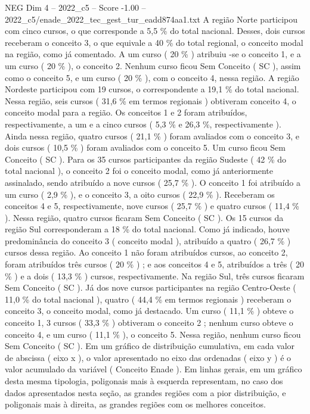 \begin{textsample}{NEG Dim 4 – 2022\_c5 – Score -1.00 – 2022\_c5/enade\_2022\_tec\_gest\_tur\_eadd874aa1.txt}
A região Norte participou com cinco cursos, o que corresponde a 5,5 \% do total nacional.
Desses, dois cursos receberam o conceito 3, o que equivale a 40 \% do total regional, o conceito modal na região, como já comentado.
A um curso ( 20 \% ) atribuiu -se o conceito 1, e a um curso ( 20 \% ), o conceito 2.
Nenhum curso ficou Sem Conceito ( SC ), assim como o conceito 5, e um curso ( 20 \% ), com o conceito 4, nessa região.
A região Nordeste participou com 19 cursos, o correspondente a 19,1 \% do total nacional.
Nessa região, seis cursos ( 31,6 \% em termos regionais ) obtiveram conceito 4, o conceito modal para a região.
Os conceitos 1 e 2 foram atribuídos, respectivamente, a um e a cinco cursos ( 5,3 \% e 26,3 \%, respectivamente ).
Ainda nessa região, quatro cursos ( 21,1 \% ) foram avaliados com o conceito 3, e dois cursos ( 10,5 \% ) foram avaliados com o conceito 5.
Um curso ficou Sem Conceito ( SC ).
Para os 35 cursos participantes da região Sudeste ( 42 \% do total nacional ), o conceito 2 foi o conceito modal, como já anteriormente assinalado, sendo atribuído a nove cursos ( 25,7 \% ).
O conceito 1 foi atribuído a um curso ( 2,9 \% ), e o conceito 3, a oito cursos ( 22,9 \% ).
Receberam os conceitos 4 e 5, respectivamente, nove cursos ( 25,7 \% ) e quatro cursos ( 11,4 \% ).
Nessa região, quatro cursos ficaram Sem Conceito ( SC ).
Os 15 cursos da região Sul corresponderam a 18 \% do total nacional.
Como já indicado, houve predominância do conceito 3 ( conceito modal ), atribuído a quatro ( 26,7 \% ) cursos dessa região.
Ao conceito 1 não foram atribuídos cursos, ao conceito 2, foram atribuídos três cursos ( 20 \% ) ; e aos conceitos 4 e 5, atribuídos a três ( 20 \% ) e a dois ( 13,3 \% ) cursos, respectivamente.
Na região Sul, três cursos ficaram Sem Conceito ( SC ).
Já dos nove cursos participantes na região Centro-Oeste ( 11,0 \% do total nacional ), quatro ( 44,4 \% em termos regionais ) receberam o conceito 3, o conceito modal, como já destacado.
Um curso ( 11,1 \% ) obteve o conceito 1, 3 cursos ( 33,3 \% ) obtiveram o conceito 2 ; nenhum curso obteve o conceito 4, e um curso ( 11,1 \% ), o conceito 5.
Nessa região, nenhum curso ficou Sem Conceito ( SC ).
Em um gráfico de distribuição cumulativa, em cada valor de abscissa ( eixo x ), o valor apresentado no eixo das ordenadas ( eixo y ) é o valor acumulado da variável ( Conceito Enade ).
Em linhas gerais, em um gráfico desta mesma tipologia, poligonais mais à esquerda representam, no caso dos dados apresentados nesta seção, as grandes regiões com a pior distribuição, e poligonais mais à direita, as grandes regiões com os melhores conceitos.

\end{textsample}
